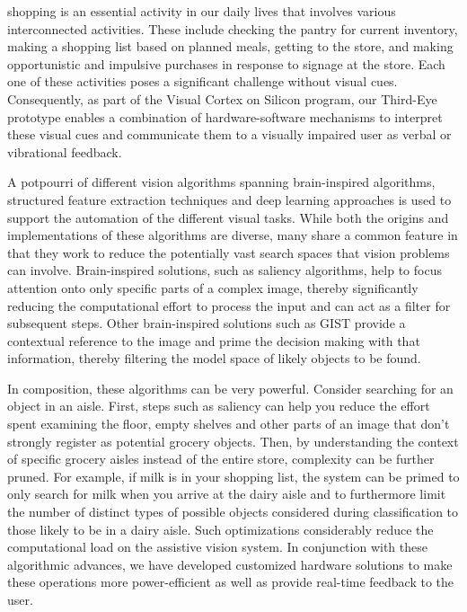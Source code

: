  shopping is an essential 
activity in our daily lives that involves various
interconnected activities. These include checking the pantry for
current inventory, making a shopping list based on planned meals,
getting to the store, and making opportunistic and impulsive purchases
in response to signage at the store. Each one of these activities
poses a significant challenge without visual cues. Consequently, as part of 
the Visual Cortex on Silicon program, our
Third-Eye prototype enables a combination of hardware-software
mechanisms to interpret these visual cues and communicate them to a
visually impaired user as verbal or vibrational feedback.

A potpourri of different vision algorithms spanning brain-inspired
algorithms, structured feature extraction techniques and deep learning
approaches is used to support the automation of the different visual
tasks. While both the origins and implementations of these algorithms
are diverse, many share a common feature in that they work to reduce
the potentially vast search spaces that vision problems can
involve. Brain-inspired solutions, such as saliency algorithms, help
to focus attention onto only specific parts of a complex image,
thereby significantly reducing the computational effort to process the
input and can act as a filter for subsequent steps.  Other
brain-inspired solutions such as GIST provide a contextual reference
to the image and prime the decision making with that information,
thereby filtering the model space of likely objects to be found.

In composition, these algorithms can be very powerful. Consider
searching for an object in an aisle. First, steps such as saliency can
help you reduce the effort spent examining the floor, empty shelves
and other parts of an image that don't strongly register as potential
grocery objects. Then, by understanding the context of specific
grocery aisles instead of the entire store, complexity can be further
pruned.  For example, if milk is in your shopping list, the system can
be primed to only search for milk when you arrive at the dairy aisle
and to furthermore limit the number of distinct types of possible
objects considered during classification to those likely to be in a
dairy aisle. Such optimizations considerably reduce the computational
load on the assistive vision system. In conjunction with these
algorithmic advances, we have developed customized hardware solutions
to make these operations more power-efficient as well as provide
real-time feedback to the user.

